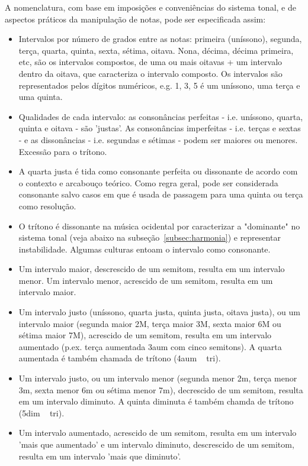 A nomenclatura, com base em imposições e conveniências do sistema tonal, e de aspectos práticos da manipulação de notas, pode ser especificada assim:\cite{Roederer,Wisnick}
\begin{itemize}
        \item Intervalos por número de grados entre as notas: primeira (uníssono), segunda, terça, quarta, quinta, sexta, sétima, oitava. Nona, décima, décima primeira, etc, são os intervalos compostos, de uma ou mais oitavas + um intervalo dentro da oitava, que caracteriza o intervalo composto. Os intervalos são representados pelos dígitos numéricos, e.g. 1, 3, 5 é um uníssono, uma terça e uma quinta.
        \item Qualidades de cada intervalo: as consonâncias perfeitas - i.e. uníssono, quarta, quinta e oitava - são 'justas'. As consonâncias imperfeitas - i.e. terças e sextas - e as dissonâncias - i.e. segundas e sétimas - podem ser maiores ou menores. Excessão para o trítono.
        \item A quarta justa é tida como consonante perfeita ou dissonante de acordo com o contexto e arcabouço teórico. Como regra geral, pode ser considerada consonante salvo casos em que é usada de passagem para uma quinta ou terça como resolução.
        \item O trítono é dissonante na música ocidental por caracterizar a "dominante" no sistema tonal (veja abaixo na subseção~\ref{subsec:harmonia}) e representar instabilidade. Algumas culturas entoam o intervalo como consonante.
        \item Um intervalo maior, descrescido de um semitom, resulta em um intervalo menor. Um intervalo menor, acrescido de um semitom, resulta em um intervalo maior.
        \item Um intervalo justo (uníssono, quarta justa, quinta justa, oitava justa), ou um intervalo maior (segunda maior 2M, terça maior 3M, sexta maior 6M ou sétima maior 7M), acrescido de um semitom, resulta em um intervalo aumentado (p.ex. terça aumentada 3aum com cinco semitons). A quarta aumentada é também chamada de trítono (4aum ~ tri).
        \item Um intervalo justo, ou um intervalo menor (segunda menor 2m, terça menor 3m, sexta menor 6m ou sétima menor 7m), decrescido de um semitom, resulta em um intervalo diminuto. A quinta diminuta é também chamda de trítono (5dim ~ tri).
        \item Um intervalo aumentado, acrescido de um semitom, resulta em um intervalo 'mais que aumentado' e um intervalo diminuto, descrescido de um semitom, resulta em um intervalo 'mais que diminuto'.

\end{itemize}
